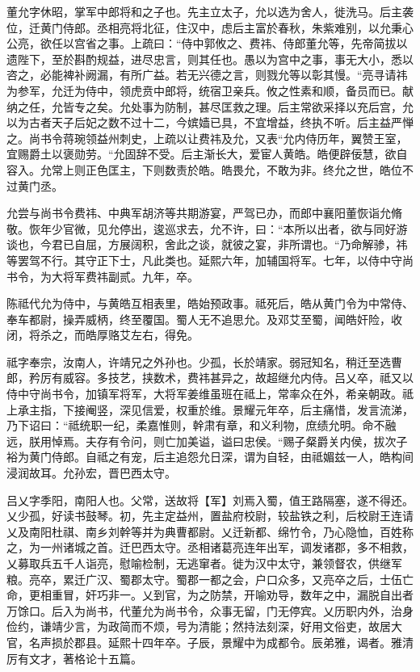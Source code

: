 \documentclass[12pt,UTF8]{ctexbook}
\begin{document}
董允字休昭，掌军中郎将和之子也。先主立太子，允以选为舍人，徙洗马。后主袭位，迁黄门侍郎。丞相亮将北征，住汉中，虑后主富於春秋，朱紫难别，以允秉心公亮，欲任以宫省之事。上疏曰：“侍中郭攸之、费祎、侍郎董允等，先帝简拔以遗陛下，至於斟酌规益，进尽忠言，则其任也。愚以为宫中之事，事无大小，悉以咨之，必能裨补阙漏，有所广益。若无兴德之言，则戮允等以彰其慢。“亮寻请祎为参军，允迁为侍中，领虎贲中郎将，统宿卫亲兵。攸之性素和顺，备员而已。献纳之任，允皆专之矣。允处事为防制，甚尽匡救之理。后主常欲采择以充后宫，允以为古者天子后妃之数不过十二，今嫔嫱已具，不宜增益，终执不听。后主益严惮之。尚书令蒋琬领益州刺史，上疏以让费祎及允，又表“允内侍历年，翼赞王室，宜赐爵土以褒勋劳。“允固辞不受。后主渐长大，爱宦人黄皓。皓便辟佞慧，欲自容入。允常上则正色匡主，下则数责於皓。皓畏允，不敢为非。终允之世，皓位不过黄门丞。

允尝与尚书令费祎、中典军胡济等共期游宴，严驾已办，而郎中襄阳董恢诣允脩敬。恢年少官微，见允停出，逡巡求去，允不许，曰：“本所以出者，欲与同好游谈也，今君已自屈，方展阔积，舍此之谈，就彼之宴，非所谓也。“乃命解骖，祎等罢驾不行。其守正下士，凡此类也。延熙六年，加辅国将军。七年，以侍中守尚书令，为大将军费祎副贰。九年，卒。

陈祗代允为侍中，与黄皓互相表里，皓始预政事。祗死后，皓从黄门令为中常侍、奉车都尉，操弄威柄，终至覆国。蜀人无不追思允。及邓艾至蜀，闻皓奸险，收闭，将杀之，而皓厚赂艾左右，得免。

祗字奉宗，汝南人，许靖兄之外孙也。少孤，长於靖家。弱冠知名，稍迁至选曹郎，矜厉有威容。多技艺，挟数术，费祎甚异之，故超继允内侍。吕乂卒，祗又以侍中守尚书令，加镇军将军，大将军姜维虽班在祗上，常率众在外，希亲朝政。祗上承主指，下接阉竖，深见信爱，权重於维。景耀元年卒，后主痛惜，发言流涕，乃下诏曰：“祗统职一纪，柔嘉惟则，幹肃有章，和义利物，庶绩允明。命不融远，朕用悼焉。夫存有令问，则亡加美谥，谥曰忠侯。“赐子粲爵关内侯，拔次子裕为黄门侍郎。自祗之有宠，后主追怨允日深，谓为自轻，由祗媚兹一人，皓构间浸润故耳。允孙宏，晋巴西太守。

吕乂字季阳，南阳人也。父常，送故将【军】刘焉入蜀，值王路隔塞，遂不得还。乂少孤，好读书鼓琴。初，先主定益州，置盐府校尉，较盐铁之利，后校尉王连请乂及南阳杜祺、南乡刘幹等并为典曹都尉。乂迁新都、绵竹令，乃心隐恤，百姓称之，为一州诸城之首。迁巴西太守。丞相诸葛亮连年出军，调发诸郡，多不相救，乂募取兵五千人诣亮，慰喻检制，无逃窜者。徙为汉中太守，兼领督农，供继军粮。亮卒，累迁广汉、蜀郡太守。蜀郡一都之会，户口众多，又亮卒之后，士伍亡命，更相重冒，奸巧非一。乂到官，为之防禁，开喻劝导，数年之中，漏脱自出者万馀口。后入为尚书，代董允为尚书令，众事无留，门无停宾。乂历职内外，治身俭约，谦靖少言，为政简而不烦，号为清能；然持法刻深，好用文俗吏，故居大官，名声损於郡县。延熙十四年卒。子辰，景耀中为成都令。辰弟雅，谒者。雅清厉有文才，著格论十五篇。
\end{document}
